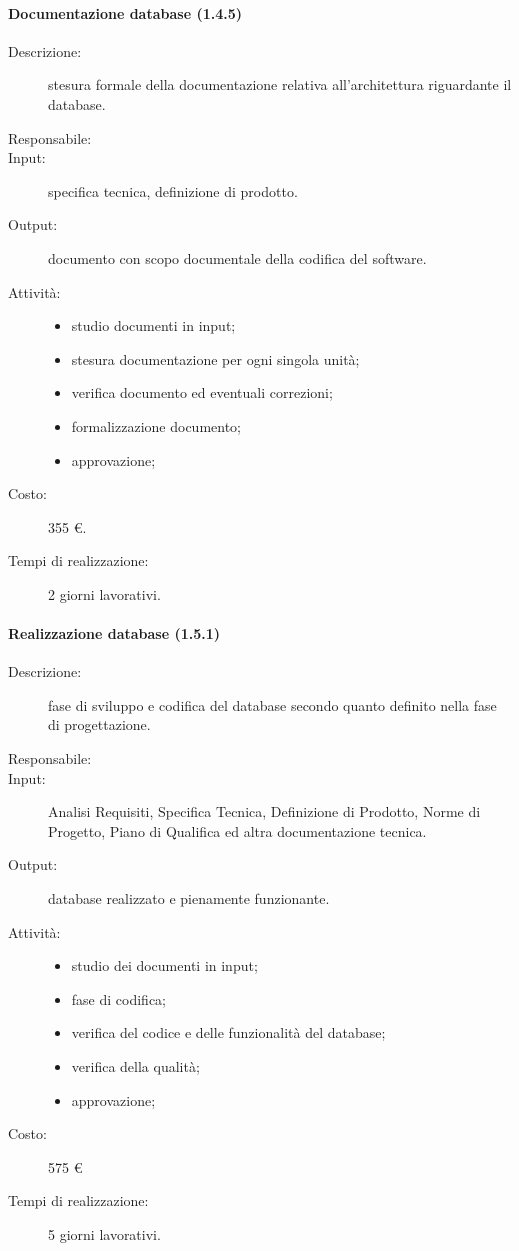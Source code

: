 \paragraph{Documentazione database (1.4.5)}
\begin{description}
\item[Descrizione:] stesura formale della documentazione relativa all'architettura riguardante il database.
\item[Responsabile:] 
\item[Input:] specifica tecnica, definizione di prodotto.
\item[Output:] documento con scopo documentale della codifica del software.
\item[Attività:] 
\begin{center}
\begin{itemize}
\item studio documenti in input;
\item stesura documentazione per ogni singola unità;
\item verifica documento ed eventuali correzioni;
\item formalizzazione documento;
\item approvazione;
\end{itemize}
\end{center}
\item[Costo:] 355 \euro{}.
\item[Tempi di realizzazione:] 2 giorni lavorativi.
\end{description}

\paragraph{Realizzazione database (1.5.1)}
\begin{description}
\item[Descrizione:] fase di sviluppo e codifica del database secondo quanto definito nella fase di progettazione.
\item[Responsabile:] 
\item[Input:] Analisi Requisiti, Specifica Tecnica, Definizione di Prodotto, Norme di Progetto, Piano di Qualifica ed altra documentazione tecnica.
\item[Output:]database realizzato e pienamente funzionante.
\item[Attività:] 
\begin{center}
\begin{itemize}
\item studio dei documenti in input;
\item fase di codifica;
\item verifica del codice e delle funzionalità del database;
\item verifica della qualità;
\item approvazione;
\end{itemize}
\end{center}
\item[Costo:] 575 \euro{}
\item[Tempi di realizzazione:] 5 giorni lavorativi.
\end{description}

